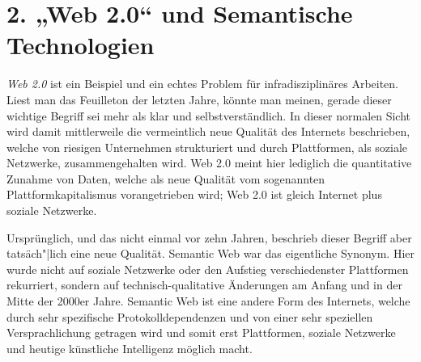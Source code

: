 \documentclass[12pt,a4paper]{article}
\begin{document}
\section*{2. „Web 2.0“ und Semantische Technologien}

\emph{Web 2.0} ist ein Beispiel und ein echtes Problem für infradisziplinäres
Arbeiten. Liest man das Feuilleton der letzten Jahre, könnte man meinen,
gerade dieser wichtige Begriff sei mehr als klar und selbstverständlich. In
dieser normalen Sicht wird damit mittlerweile die vermeintlich neue Qualität
des Internets beschrieben, welche von riesigen Unternehmen strukturiert und
durch Plattformen, als soziale Netzwerke, zusammengehalten wird. Web 2.0 meint
hier lediglich die quantitative Zunahme von Daten, welche als neue Qualität
vom sogenannten Plattformkapitalismus vorangetrieben wird; Web 2.0 ist gleich
Internet plus soziale Netzwerke.

Ursprünglich, und das nicht einmal vor zehn Jahren, beschrieb dieser Begriff
aber tatsäch"|lich eine neue Qualität. Semantic Web war das eigentliche
Synonym. Hier wurde nicht auf soziale Netzwerke oder den Aufstieg
verschiedenster Plattformen rekurriert, sondern auf technisch-qualitative
Änderungen am Anfang und in der Mitte der 2000er Jahre. Semantic Web ist eine
andere Form des Internets, welche durch sehr spezifische Protokolldependenzen
und von einer sehr speziellen Versprachlichung getragen wird und somit erst
Plattformen, soziale Netzwerke und heutige künstliche Intelligenz möglich
macht.
\end{document}
